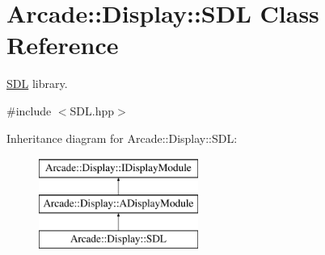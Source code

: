 \hypertarget{classArcade_1_1Display_1_1SDL}{}\section{Arcade\+::Display\+::S\+DL Class Reference}
\label{classArcade_1_1Display_1_1SDL}


\mbox{\hyperlink{classArcade_1_1Display_1_1SDL}{S\+DL}} library.  




{\ttfamily \#include $<$S\+D\+L.\+hpp$>$}

Inheritance diagram for Arcade\+::Display\+::S\+DL\+:\begin{figure}[H]
\begin{center}
\leavevmode
\includegraphics[height=3.000000cm]{classArcade_1_1Display_1_1SDL}
\end{center}
\end{figure}
